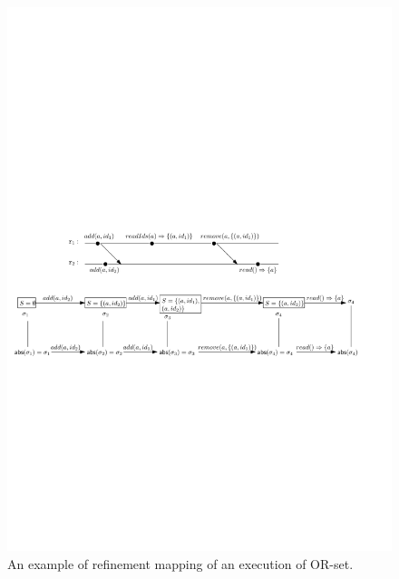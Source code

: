 \begin{figure}[t]
  \centering
  \includegraphics[width=0.85 \textwidth]{figures/RefinementMappingORSet.pdf}
\vspace{-10pt}
  \caption{An example of refinement mapping of an execution of OR-set.}
  \label{fig:an example of refinement mapping of an execution of or-set}
\end{figure}




